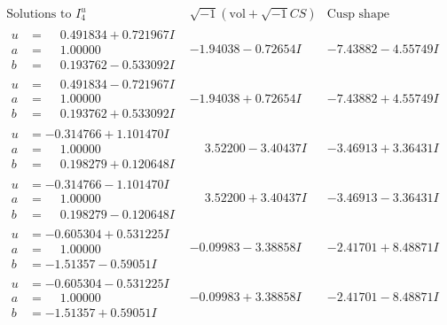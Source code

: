 \documentclass[1p]{elsarticle_modified}
\theoremstyle{definition}
\newcommand{\I}{\sqrt{-1}}
\begin{document}
$$\begin{array}{c|c|c}  
\text{Solutions to }I^u_{4}& \I (\text{vol} + \sqrt{-1}CS) & \text{Cusp shape}\\
 \hline 
\begin{aligned}
u &= \phantom{-}0.491834 + 0.721967 I \\
a &= \phantom{-}1.00000\phantom{ +0.000000I} \\
b &= \phantom{-}0.193762 - 0.533092 I\end{aligned}
 & -1.94038 - 0.72654 I & -7.43882 - 4.55749 I \\ \hline\begin{aligned}
u &= \phantom{-}0.491834 - 0.721967 I \\
a &= \phantom{-}1.00000\phantom{ +0.000000I} \\
b &= \phantom{-}0.193762 + 0.533092 I\end{aligned}
 & -1.94038 + 0.72654 I & -7.43882 + 4.55749 I \\ \hline\begin{aligned}
u &= -0.314766 + 1.101470 I \\
a &= \phantom{-}1.00000\phantom{ +0.000000I} \\
b &= \phantom{-}0.198279 + 0.120648 I\end{aligned}
 & \phantom{-}3.52200 - 3.40437 I & -3.46913 + 3.36431 I \\ \hline\begin{aligned}
u &= -0.314766 - 1.101470 I \\
a &= \phantom{-}1.00000\phantom{ +0.000000I} \\
b &= \phantom{-}0.198279 - 0.120648 I\end{aligned}
 & \phantom{-}3.52200 + 3.40437 I & -3.46913 - 3.36431 I \\ \hline\begin{aligned}
u &= -0.605304 + 0.531225 I \\
a &= \phantom{-}1.00000\phantom{ +0.000000I} \\
b &= -1.51357 - 0.59051 I\end{aligned}
 & -0.09983 - 3.38858 I & -2.41701 + 8.48871 I \\ \hline\begin{aligned}
u &= -0.605304 - 0.531225 I \\
a &= \phantom{-}1.00000\phantom{ +0.000000I} \\
b &= -1.51357 + 0.59051 I\end{aligned}
 & -0.09983 + 3.38858 I & -2.41701 - 8.48871 I \\ \hline\begin{aligned}

\end{aligned}
\end{array}$$
\end{document}
